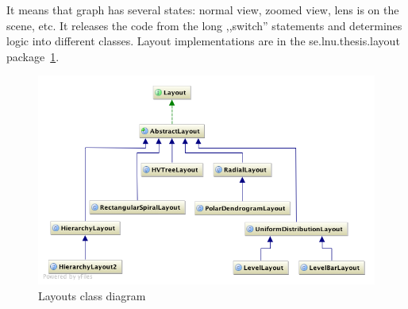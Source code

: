 It means that graph has several states: normal view, zoomed view, lens is on the scene, etc. It releases the code from the long ,,switch'' statements  and determines logic into different classes. Layout implementations are in the \textsf{se.lnu.thesis.layout} package~\ref{fig:uml_layouts}.

\begin{figure}[h!]
\centering
\includegraphics[scale=0.5]{pictures/uml_layouts.png}
\caption{Layouts class diagram}
\label{fig:uml_layouts}
\end{figure}
